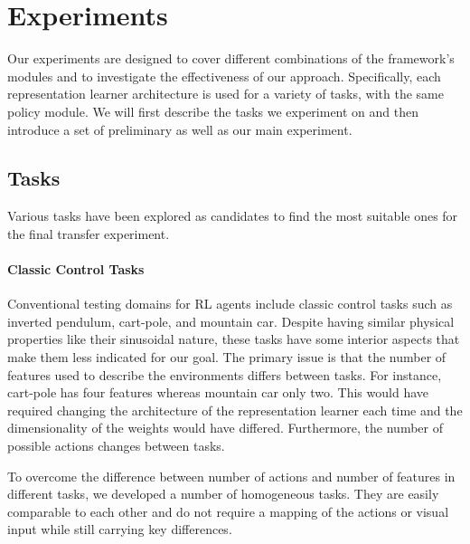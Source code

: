 \section{Experiments}
\label{sec:experiments}

Our experiments are designed to cover different combinations of the framework's modules and to investigate the effectiveness of our approach. Specifically, each representation learner architecture is used for a variety of tasks, with the same policy module. We will first describe the tasks we experiment on and then introduce a set of preliminary as well as our main experiment.

\subsection{Tasks}
\label{sec:tasks}
Various tasks have been explored as candidates to find the most suitable ones for the final transfer experiment.


\paragraph{Classic Control Tasks} 
Conventional testing domains for RL agents include classic control tasks such as inverted pendulum, cart-pole, and mountain car.
Despite having similar physical properties like their sinusoidal nature, these tasks have some interior aspects that make them less indicated for our goal. 
The primary issue is that the number of features used to describe the environments differs between tasks. For instance, cart-pole has four features whereas mountain car only two. This would have required changing the architecture of the representation learner each time and the dimensionality of the weights would have differed. 
Furthermore, the number of possible actions changes between tasks.

To overcome the difference between number of actions and number of features in different tasks, we developed a number of homogeneous tasks. They are easily comparable to each other and do not require a mapping of the actions or visual input while still carrying key differences. 

